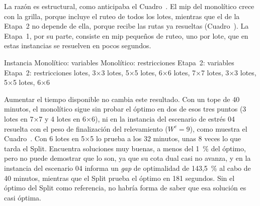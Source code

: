 La razón es estructural, como anticipaba el
Cuadro~. El \ac{mip} del monolítico crece con la
grilla, porque incluye el ruteo de todos los lotes, mientras que el de la
Etapa~2 no depende de ella, porque recibe las rutas ya resueltas
(Cuadro~). La Etapa~1, por su parte, consiste en
\ac{mip} pequeños de ruteo, uno por lote, que en estas instancias se resuelven
en pocos segundos.

\startplacetable[reference=tab:res_tamano_mip, location=here, title={Tamaño del \ac{mip} que resuelve SCIP: el modelo monolítico completo y la Etapa~2 del Split.}]
	\bTABLE[split=yes, align=middle, frame=on, width=fit]
	\setupTABLE[row][1][background=color, backgroundcolor=darkgray, style=bold]
	\setupTABLE[column][2,3,4,5][align=flushright]
	\bTR \bTH Instancia \eTH \bTH Monolítico: variables \eTH \bTH Monolítico: restricciones \eTH \bTH Etapa~2: variables \eTH \bTH Etapa~2: restricciones \eTH \eTR
	\bTR {} lotes, 3×3 \eTD {} \eTD {} \eTD {} \eTD {} \eTD \eTR
	\bTR {} lotes, 5×5 \eTD {} \eTD {} \eTD {} \eTD {} \eTD \eTR
	\bTR {} lotes, 6×6 \eTD {} \eTD {} \eTD {} \eTD {} \eTD \eTR
	\bTR {} lotes, 7×7 \eTD {} \eTD {} \eTD {} \eTD {} \eTD \eTR
	\bTR {} lotes, 3×3 \eTD {} \eTD {} \eTD {} \eTD {} \eTD \eTR
	\bTR {} lotes, 5×5 \eTD {} \eTD {} \eTD {} \eTD {} \eTD \eTR
	\bTR {} lotes, 6×6 \eTD {} \eTD {} \eTD {} \eTD {} \eTD \eTR
	\eTABLE
\stopplacetable

Aumentar el tiempo disponible no cambia este resultado. Con un tope de 40
minutos, el monolítico sigue sin probar el óptimo en dos de esos tres
puntos (3 lotes en 7×7 y 4 lotes en 6×6), ni en la instancia del escenario
de estrés 04 resuelta con el peso de finalización del relevamiento
($W^{c} = 9$), como muestra el Cuadro~. Con 6 lotes en
5×5 lo prueba a los 32 minutos, unas 8 veces lo que tarda el Split. Encuentra
soluciones muy buenas, a menos del 1~\% del óptimo, pero no puede demostrar
que lo son, ya que su cota dual casi no avanza, y en la instancia del escenario 04
informa un {\em gap} de optimalidad de 143,5~\% al cabo de 40 minutos,
mientras que el Split prueba el óptimo en 181 segundos. Sin el óptimo del
Split como referencia, no habría forma de saber que esa solución es casi
óptima.

